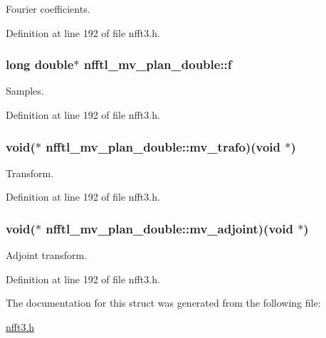 Fourier coefficients. 



Definition at line 192 of file nfft3.\-h.

\hypertarget{structnfftl__mv__plan__double_ae6c4a0204a54f2a37a0acf2b3f5a0c0c}{
\subsubsection[{f}]{\setlength{\rightskip}{0pt plus 5cm}long double$\ast$ nfftl\-\_\-mv\-\_\-plan\-\_\-double\-::f}}\label{structnfftl__mv__plan__double_ae6c4a0204a54f2a37a0acf2b3f5a0c0c}


Samples. 



Definition at line 192 of file nfft3.\-h.

\hypertarget{structnfftl__mv__plan__double_aff66252bd97fa6d73d7e137d888bb625}{
\subsubsection[{mv\-\_\-trafo}]{\setlength{\rightskip}{0pt plus 5cm}void($\ast$ nfftl\-\_\-mv\-\_\-plan\-\_\-double\-::mv\-\_\-trafo)(void $\ast$)}}\label{structnfftl__mv__plan__double_aff66252bd97fa6d73d7e137d888bb625}


Transform. 



Definition at line 192 of file nfft3.\-h.

\hypertarget{structnfftl__mv__plan__double_a804a64f2fb25ad91487fbcc186d784e0}{
\subsubsection[{mv\-\_\-adjoint}]{\setlength{\rightskip}{0pt plus 5cm}void($\ast$ nfftl\-\_\-mv\-\_\-plan\-\_\-double\-::mv\-\_\-adjoint)(void $\ast$)}}\label{structnfftl__mv__plan__double_a804a64f2fb25ad91487fbcc186d784e0}


Adjoint transform. 



Definition at line 192 of file nfft3.\-h.



The documentation for this struct was generated from the following file\-:\begin{DoxyCompactItemize}
\item 
\hyperlink{nfft3_8h}{nfft3.\-h}\end{DoxyCompactItemize}
